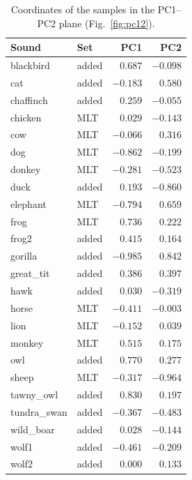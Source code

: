 \begin{table}[H]
\centering
\caption{Coordinates of the samples in the PC1--PC2 plane (Fig.~\ref{fig:pc12}).}
\label{tab:pc12}
\begin{tabular}{llrr}
\hline
Sound & Set & PC1 & PC2 \\
\hline
blackbird & added & $0.687$ & $-0.098$ \\
cat & added & $-0.183$ & $0.580$ \\
chaffinch & added & $0.259$ & $-0.055$ \\
chicken & MLT & $0.029$ & $-0.143$ \\
cow & MLT & $-0.066$ & $0.316$ \\
dog & MLT & $-0.862$ & $-0.199$ \\
donkey & MLT & $-0.281$ & $-0.523$ \\
duck & added & $0.193$ & $-0.860$ \\
elephant & MLT & $-0.794$ & $0.659$ \\
frog & MLT & $0.736$ & $0.222$ \\
frog2 & added & $0.415$ & $0.164$ \\
gorilla & added & $-0.985$ & $0.842$ \\
great\_tit & added & $0.386$ & $0.397$ \\
hawk & added & $0.030$ & $-0.319$ \\
horse & MLT & $-0.411$ & $-0.003$ \\
lion & MLT & $-0.152$ & $0.039$ \\
monkey & MLT & $0.515$ & $0.175$ \\
owl & added & $0.770$ & $0.277$ \\
sheep & MLT & $-0.317$ & $-0.964$ \\
tawny\_owl & added & $0.830$ & $0.197$ \\
tundra\_swan & added & $-0.367$ & $-0.483$ \\
wild\_boar & added & $0.028$ & $-0.144$ \\
wolf1 & added & $-0.461$ & $-0.209$ \\
wolf2 & added & $0.000$ & $0.133$ \\
\hline
\end{tabular}
\end{table}
